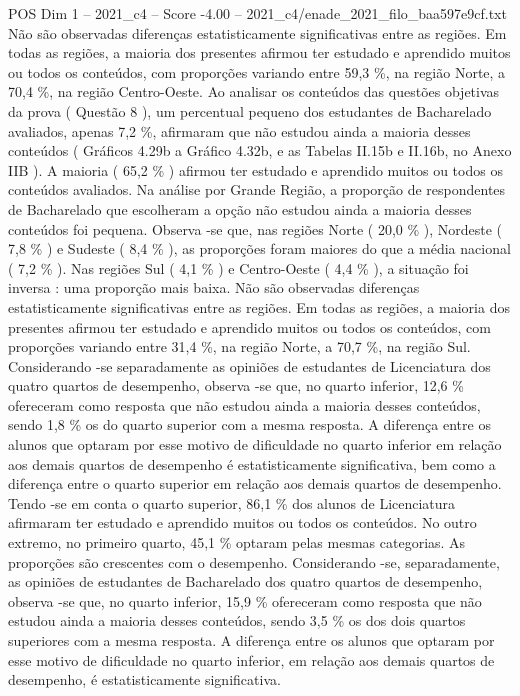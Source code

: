 \begin{textsample}{POS Dim 1 – 2021\_c4 – Score -4.00 – 2021\_c4/enade\_2021\_filo\_baa597e9cf.txt}
Não são observadas diferenças estatisticamente significativas entre as regiões.
Em todas as regiões, a maioria dos presentes afirmou ter estudado e aprendido muitos ou todos os conteúdos, com proporções variando entre 59,3 \%, na região Norte, a 70,4 \%, na região Centro-Oeste.
Ao analisar os conteúdos das questões objetivas da prova ( Questão 8 ), um percentual pequeno dos estudantes de Bacharelado avaliados, apenas 7,2 \%, afirmaram que não estudou ainda a maioria desses conteúdos ( Gráficos 4.29b a Gráfico 4.32b, e as Tabelas II.15b e II.16b, no Anexo IIB ).
A maioria ( 65,2 \% ) afirmou ter estudado e aprendido muitos ou todos os conteúdos avaliados.
Na análise por Grande Região, a proporção de respondentes de Bacharelado que escolheram a opção não estudou ainda a maioria desses conteúdos foi pequena.
Observa -se que, nas regiões Norte ( 20,0 \% ), Nordeste ( 7,8 \% ) e Sudeste ( 8,4 \% ), as proporções foram maiores do que a média nacional ( 7,2 \% ).
Nas regiões Sul ( 4,1 \% ) e Centro-Oeste ( 4,4 \% ), a situação foi inversa : uma proporção mais baixa.
Não são observadas diferenças estatisticamente significativas entre as regiões.
Em todas as regiões, a maioria dos presentes afirmou ter estudado e aprendido muitos ou todos os conteúdos, com proporções variando entre 31,4 \%, na região Norte, a 70,7 \%, na região Sul.
Considerando -se separadamente as opiniões de estudantes de Licenciatura dos quatro quartos de desempenho, observa -se que, no quarto inferior, 12,6 \% ofereceram como resposta que não estudou ainda a maioria desses conteúdos, sendo 1,8 \% os do quarto superior com a mesma resposta.
A diferença entre os alunos que optaram por esse motivo de dificuldade no quarto inferior em relação aos demais quartos de desempenho é estatisticamente significativa, bem como a diferença entre o quarto superior em relação aos demais quartos de desempenho.
Tendo -se em conta o quarto superior, 86,1 \% dos alunos de Licenciatura afirmaram ter estudado e aprendido muitos ou todos os conteúdos.
No outro extremo, no primeiro quarto, 45,1 \% optaram pelas mesmas categorias.
As proporções são crescentes com o desempenho.
Considerando -se, separadamente, as opiniões de estudantes de Bacharelado dos quatro quartos de desempenho, observa -se que, no quarto inferior, 15,9 \% ofereceram como resposta que não estudou ainda a maioria desses conteúdos, sendo 3,5 \% os dos dois quartos superiores com a mesma resposta.
A diferença entre os alunos que optaram por esse motivo de dificuldade no quarto inferior, em relação aos demais quartos de desempenho, é estatisticamente significativa.

\end{textsample}
